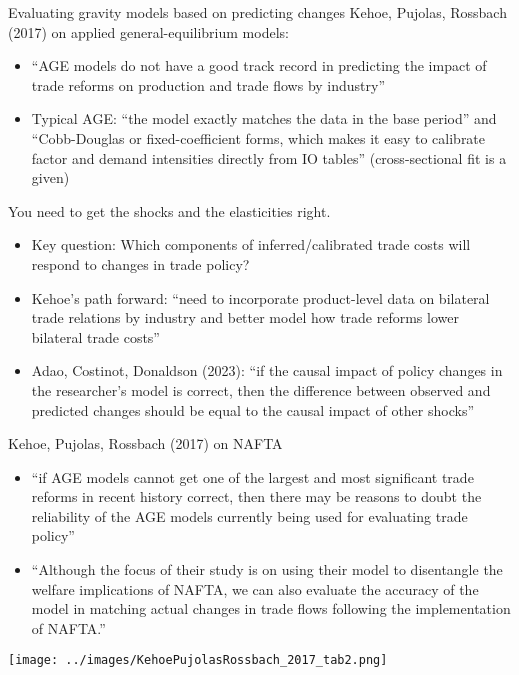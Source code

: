 \documentclass[10pt,notes=hide,aspectratio=169]{beamer}
\begin{document}
\begin{frame}{Evaluating gravity models based on predicting changes}
Kehoe, Pujolas, Rossbach (2017) on applied general-equilibrium models:
\begin{itemize}
\item ``AGE models do not have a good track record in predicting the impact of trade reforms on production and trade flows by industry''
\item Typical AGE: ``the model exactly matches the data in the base period'' and ``Cobb-Douglas or fixed-coefficient forms, which makes it easy to calibrate factor and demand intensities directly from IO tables'' (cross-sectional fit is a given)
\end{itemize}
You need to get the shocks and the elasticities right.
\begin{itemize}
\item Key question: Which components of inferred/calibrated trade costs will respond to changes in trade policy?
\item Kehoe's path forward: ``need to incorporate product-level data on bilateral trade relations by industry and better model how trade reforms lower bilateral trade costs''
\item Adao, Costinot, Donaldson (2023):
``if the causal impact of policy changes in the researcher's model is correct, then the difference between observed and predicted changes should be equal to the causal impact of other shocks''
\end{itemize}
\end{frame}
\begin{frame}{Kehoe, Pujolas, Rossbach (2017) on NAFTA}
\begin{itemize}
\item {\small ``if AGE models cannot get one of the largest and most significant trade reforms in recent history correct, then there may be reasons to doubt the reliability of the AGE models currently being used for evaluating trade policy''\par}
\item {\small ``Although the focus of their study is on using their model to disentangle the welfare implications of NAFTA, we can also evaluate the accuracy of the model in matching actual changes in trade flows following the implementation of NAFTA.''\par}
\end{itemize}
\texttt{[image: ../images/KehoePujolasRossbach\_2017\_tab2.png]}
\end{frame}
\end{document}
